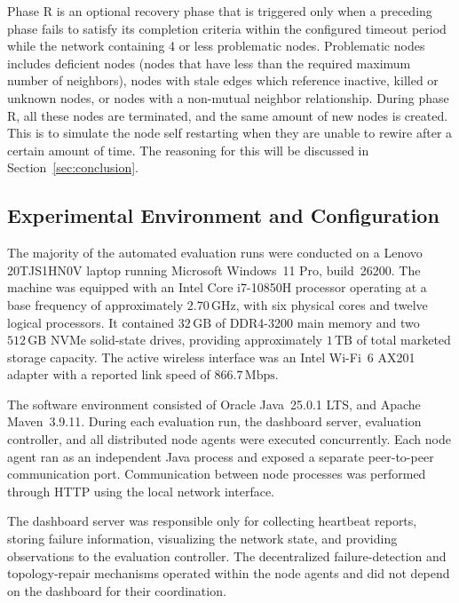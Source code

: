 Phase R is an optional recovery phase that is triggered only when a preceding phase fails to satisfy its completion
criteria within the configured timeout period while the network containing 4 or less problematic nodes. Problematic
nodes includes deficient nodes (nodes that have less than the required maximum number of neighbors), nodes with stale
edges which reference inactive, killed or unknown nodes, or nodes with a non-mutual neighbor relationship. During phase
R, all these nodes are terminated, and the same amount of new nodes is created. This is to simulate the node self
restarting when they are unable to rewire after a certain amount of time. The reasoning for this will be discussed in
Section~\ref{sec:conclusion}.

\subsection{Experimental Environment and Configuration}
\label{subsec:experimental_environment}

The majority of the automated evaluation runs were conducted on a Lenovo 20TJS1HN0V laptop running Microsoft Windows~11
Pro, build~26200. The machine was equipped with an Intel Core i7-10850H processor operating at a base frequency of
approximately \(2.70\,\mathrm{GHz}\), with six physical cores and twelve logical processors. It contained
\(32\,\mathrm{GB}\) of DDR4-3200 main memory and two \(512\,\mathrm{GB}\) NVMe solid-state drives, providing
approximately \(1\,\mathrm{TB}\) of total marketed storage capacity. The active wireless interface was an Intel Wi-Fi~6
AX201 adapter with a reported link speed of \(866.7\,\mathrm{Mbps}\).

The software environment consisted of Oracle Java~25.0.1 LTS, and Apache Maven~3.9.11. During each evaluation run, the
dashboard server, evaluation controller, and all distributed node agents were executed concurrently. Each node agent
ran as an independent Java process and exposed a separate peer-to-peer communication port. Communication between node
processes was performed through HTTP using the local network interface.

The dashboard server was responsible only for collecting heartbeat reports, storing failure information, visualizing
the network state, and providing observations to the evaluation controller. The decentralized failure-detection and
topology-repair mechanisms operated within the node agents and did not depend on the dashboard for their coordination.

